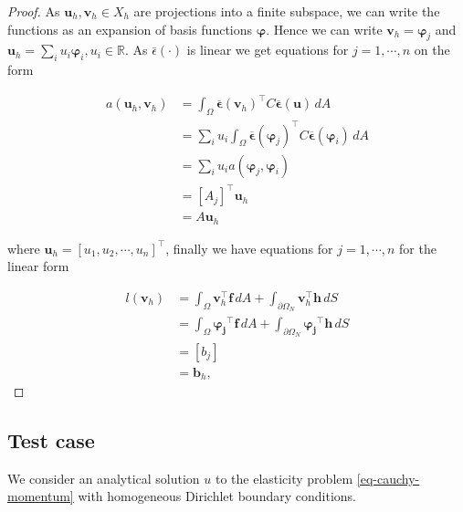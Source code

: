 \documentclass[11pt,a4paper,english]{elsarticle}%
\begin{document}
\begin{proof}
    As $\bm u_h,\bm v_h \in X_h$ are projections into a finite subspace, we can write the functions as an expansion of basis functions $\bm \varphi$. Hence we can write 
    $\bm v_h = \bm \varphi_j$ and $\bm u_h = \sum_i u_i \bm \varphi_i, u_i \in \mathbb{R}$. As $\bar \epsilon( \cdot )$ is linear we get equations for $j = 1,\cdots,n$ on the form

    \begin{align*}
        a(\bm u_h,\bm v_h) &= \int_\Omega{ \boldsymbol{\overline \epsilon}(\bm v_h)^\intercal C\boldsymbol{\overline \epsilon}(\boldsymbol u)} \,dA  \\
        &=\sum_i u_i  \int_\Omega{ \boldsymbol{\overline \epsilon}(\boldsymbol \varphi_j)^\intercal C  \boldsymbol{\overline \epsilon}(\boldsymbol \varphi_i)} \,dA \\
        &= \sum_i u_i a(\bm \varphi_j,\bm \varphi_i) \\
        &= [A_j]^\intercal \bm u_h \\
        &= A \bm u_h
    \end{align*}

    where $\bm u_h = [u_1,u_2,\cdots,u_n]^\intercal$, finally we have equations for $j = 1,\cdots,n$ for the linear form

    \begin{align*}
            l(\bm v_h)&= \int_\Omega{\bm v_h^\intercal  \boldsymbol{f}} \,dA + \int_{\partial \Omega_N}{\bm v_h^\intercal \boldsymbol h} \,dS \\
            &= \int_\Omega{\boldsymbol{\varphi_j}^\intercal  \boldsymbol{f}} \,dA + \int_{\partial \Omega_N}{\boldsymbol{\varphi_j}^\intercal \boldsymbol h} \,dS \\
            &= [b_j]\\
            &= \bm b_h,
    \end{align*}
\end{proof}


\subsection{Test case}


    We consider an analytical solution $u$ to the elasticity problem \eqref{eq-cauchy-momentum} with homogeneous Dirichlet boundary conditions.
\end{document}
